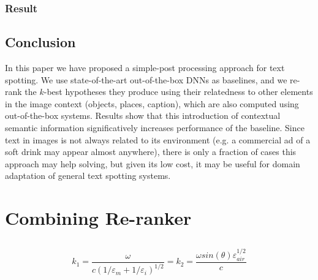 \documentclass[phd,tocprelim]{cornell}
\begin{document}
\subsection{Result}
\section{Conclusion}


In this paper we have proposed a simple-post processing approach for text spotting. We use state-of-the-art out-of-the-box DNNs as baselines, and we re-rank the $k$-best hypotheses they produce using their relatedness to other elements in the image context (objects, places, caption), which are also computed using out-of-the-box systems. Results show that this introduction of contextual semantic information significatively increases performance of the baseline. Since text in images is not always related to its environment (e.g. a commercial ad of a soft drink may appear almost anywhere), there is only a fraction of cases this approach may help solving, but given its low cost, it may be useful for domain adaptation of general text spotting systems. 



\chapter{Combining Re-ranker}
\section{}




\begin{equation}
k_1=\frac{\omega }{c({1/\varepsilon_m + 1/\varepsilon_i})^{1/2}}=k_2=\frac{\omega
sin(\theta)\varepsilon_{air}^{1/2}}{c}
\end{equation}
\end{document}
